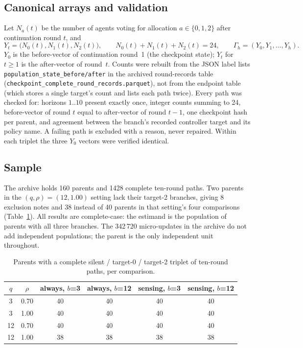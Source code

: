 \documentclass[10pt]{article}
\begin{document}
\subsection{Canonical arrays and validation}
Let $N_a(t)$ be the number of agents voting for allocation $a\in\{0,1,2\}$ after continuation round $t$, and
\begin{equation}
Y_t=\big(N_0(t),N_1(t),N_2(t)\big),\qquad N_0(t)+N_1(t)+N_2(t)=24,\qquad \Gamma_h=(Y_0,Y_1,\dots,Y_h).
\end{equation}
$Y_0$ is the before-vector of continuation round~1 (the checkpoint state); $Y_t$ for $t\ge1$ is the after-vector of round~$t$. Counts were rebuilt from the JSON label lists \texttt{population\_state\_before/after} in the archived round-records table (\texttt{checkpoint\_complete\_\allowbreak round\_records.parquet}), not from the endpoint table (which stores a single target's count and lists each path twice). Every path was checked for: horizons $1..10$ present exactly once, integer counts summing to 24, before-vector of round $t$ equal to after-vector of round $t-1$, one checkpoint hash per parent, and agreement between the branch's recorded controller target and its policy name. A failing path is excluded with a reason, never repaired. Within each triplet the three $Y_0$ vectors were verified identical.

\subsection{Sample}
The archive holds 160 parents and 1428 complete ten-round paths. Two parents in the $(q,\rho)=(12,1.00)$ setting lack their target-2 branches, giving 8 exclusion notes and 38 instead of 40 parents in that setting's four comparisons (Table~\ref{tab:sample}). All results are complete-case: the estimand is the population of parents with all three branches. The 342\,720 micro-updates in the archive do not add independent populations; the parent is the only independent unit throughout.

\begin{table}[htbp]
\centering
\small
\caption{Parents with a complete silent / target-0 / target-2 triplet of ten-round paths, per comparison.}\label{tab:sample}
\begin{tabular}{cc cccc}
\toprule
$q$ & $\rho$ & always, $b$=3 & always, $b$=12 & sensing, $b$=3 & sensing, $b$=12 \\
\midrule
3 & 0.70 & 40 & 40 & 40 & 40 \\
3 & 1.00 & 40 & 40 & 40 & 40 \\
12 & 0.70 & 40 & 40 & 40 & 40 \\
12 & 1.00 & 38 & 38 & 38 & 38 \\
\bottomrule
\end{tabular}
\end{table}
\end{document}
